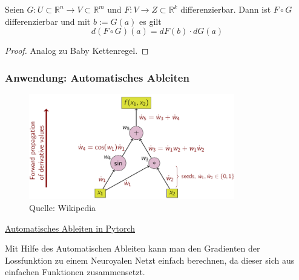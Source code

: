 \begin{Satz}[Kettenregel]
Seien $G:  U \subset \mathbb{R}^n \to V \subset \mathbb{R}^m$ und $F: V \to Z \subset \mathbb{R}^k$ differenzierbar. Dann ist $F \circ G$ differenzierbar und mit $b := G(a)$ es gilt
$$ d(F \circ G)(a) = dF(b) \cdot dG(a) $$
\end{Satz}
\begin{proof}
Analog zu Baby Kettenregel.
\end{proof}


\subsubsection*{Anwendung: Automatisches Ableiten} 


\begin{figure}[H]
      \centering
    \includegraphics[width=0.8\textwidth]{images/ad.png}
      \caption{Quelle: Wikipedia}
\end{figure}

\href{https://pytorch.org/tutorials/beginner/blitz/autograd_tutorial.html}{Automatisches Ableiten  in Pytorch}

Mit Hilfe des Automatischen Ableiten kann man den Gradienten der Lossfunktion zu einem Neuroyalen Netzt einfach berechnen, da dieser sich aus einfachen Funktionen zusammensetzt.






